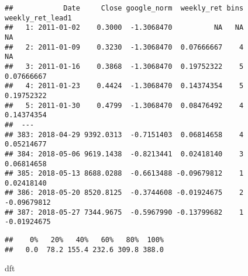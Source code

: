 \documentclass[
]{article}
\newenvironment{Shaded}{\begin{snugshade}}{\end{snugshade}}
\newcommand{\DataTypeTok}[1]{\textcolor[rgb]{0.13,0.29,0.53}{#1}}
\newcommand{\DecValTok}[1]{\textcolor[rgb]{0.00,0.00,0.81}{#1}}
\newcommand{\KeywordTok}[1]{\textcolor[rgb]{0.13,0.29,0.53}{\textbf{#1}}}
\newcommand{\NormalTok}[1]{#1}
\newcommand{\OperatorTok}[1]{\textcolor[rgb]{0.81,0.36,0.00}{\textbf{#1}}}
\newcommand{\StringTok}[1]{\textcolor[rgb]{0.31,0.60,0.02}{#1}}
\begin{document}
\begin{verbatim}
##            Date     Close google_norm  weekly_ret bins weekly_ret_lead1
##   1: 2011-01-02    0.3000  -1.3068470          NA   NA               NA
##   2: 2011-01-09    0.3230  -1.3068470  0.07666667    4               NA
##   3: 2011-01-16    0.3868  -1.3068470  0.19752322    5       0.07666667
##   4: 2011-01-23    0.4424  -1.3068470  0.14374354    5       0.19752322
##   5: 2011-01-30    0.4799  -1.3068470  0.08476492    4       0.14374354
##  ---                                                                   
## 383: 2018-04-29 9392.0313  -0.7151403  0.06814658    4       0.05214677
## 384: 2018-05-06 9619.1438  -0.8213441  0.02418140    3       0.06814658
## 385: 2018-05-13 8688.0288  -0.6613488 -0.09679812    1       0.02418140
## 386: 2018-05-20 8520.8125  -0.3744608 -0.01924675    2      -0.09679812
## 387: 2018-05-27 7344.9675  -0.5967990 -0.13799682    1      -0.01924675
\end{verbatim}

\begin{Shaded}
\end{Shaded}

\begin{verbatim}
##    0%   20%   40%   60%   80%  100% 
##   0.0  78.2 155.4 232.6 309.8 388.0
\end{verbatim}

\begin{Shaded}
\begin{Highlighting}[]
\NormalTok{dft}
\end{Highlighting}
\end{Shaded}
\end{document}
